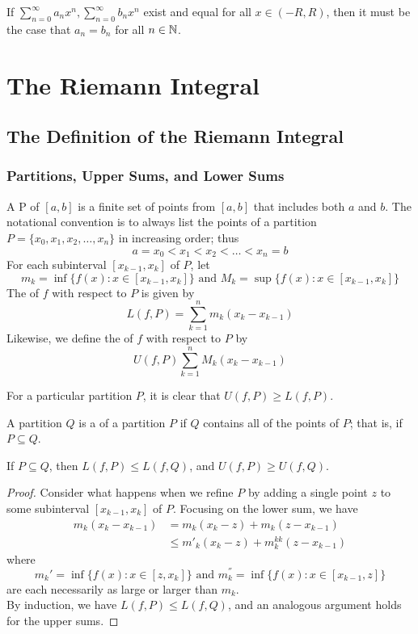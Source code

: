 \documentclass[11pt]{article}
\begin{document}
\corollary
If $\sum_{n=0}^\infty a_nx^n, \sum_{n=0}^\infty b_nx^n$ exist and equal for all $x \in (-R, R)$, then it must be the case that $a_n = b_n$ for all $n \in \mathbb{N}$.

\section{The Riemann Integral}
\subsection{The Definition of the Riemann Integral}
\subsubsection{Partitions, Upper Sums, and Lower Sums}

 A  P of $[a,b]$ is a finite set of points from $[a,b]$ that includes both $a$ and $b$. The notational convention is to always list the points of a partition $P = \{x_0, x_1, x_2, \hdots, x_n\}$ in increasing order; thus
$$a = x_0 < x_1 < x_2 < \hdots < x_n = b$$
For each subinterval $[x_{k-1}, x_k]$ of $P$, let
$$m_k = \inf\{f(x): x \in [x_{k-1}, x_k]\} \text{ and } M_k = \sup\{f(x): x \in [x_{k-1}, x_k]\}$$
The  of $f$ with respect to $P$ is given by
$$L(f, P) = \sum_{k=1}^n m_k(x_k - x_{k-1})$$
Likewise, we define the  of $f$ with respect to $P$ by
$$U(f, P) \sum_{k=1}^n M_k(x_k - x_{k-1})$$

\fact
For a particular partition $P$, it is clear that $U(f, P) \geq L(f, P)$.

A partition $Q$ is a  of a partition $P$ if $Q$ contains all of the points of $P$; that is, if $P \subseteq Q$.

\lemma If $P \subseteq Q$, then $L(f, P) \leq L(f, Q)$, and $U(f,P) \geq U(f,Q)$.

\begin{proof}
	Consider what happens when we refine $P$ by adding a single point $z$ to some subinterval $[x_{k-1}, x_k]$ of $P$. Focusing on the lower sum, we have
	\begin{align*}
		m_k(x_k - x_{k-1}) &= m_k(x_k - z) + m_k(z - x_{k-1}) \\
		&\leq m'_k(x_k - z) + m_k^{kk}(z - x_{k-1})
	\end{align*}
	where 
	$$m_k' = \inf\{ f(x): x \in [z, x_k]\} \text{ and } m_k^{''} = \inf \{f(x): x \in [x_{k-1},z]\}$$
	are each necessarily as large or larger than $m_k$.\\
	By induction, we have $L(f,P) \leq L(f,Q)$, and an analogous argument holds for the upper sums.
\end{proof}
\end{document}
